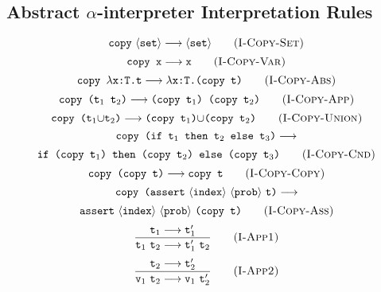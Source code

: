 \documentclass[a4paper]{article}
\begin{document}
\subsection{Abstract $\alpha$-interpreter Interpretation Rules}
\begin{equation}
	\text{\tt copy}\ \langle\text{\tt set}\rangle\longrightarrow\langle\text{\tt set}\rangle
	\tag{\sc I-Copy-Set}
\end{equation}
\begin{equation}
	\text{\tt copy x}\longrightarrow\text{\tt x}
	\tag{\sc I-Copy-Var}
\end{equation}
\begin{equation}
	\text{\tt copy }\lambda\text{\tt x:T.t}\longrightarrow\lambda\text{\tt x:T.(copy t)}
	\tag{\sc I-Copy-Abs}
\end{equation}
\begin{equation}
	\text{\tt copy (t$_1$ t$_2$)}\longrightarrow\text{\tt (copy t$_1$) (copy t$_2$)}
	\tag{\sc I-Copy-App}
\end{equation}
\begin{equation}
	\text{\tt copy (t$_1\cup$t$_2$)}\longrightarrow\text{\tt (copy t$_1$)$\cup$(copy t$_2$)}
	\tag{\sc I-Copy-Union}
\end{equation}
$$
	\text{\tt copy (if t$_1$ then t$_2$ else t$_3$)}\longrightarrow
$$
\begin{equation}
	\text{\tt if (copy t$_1$) then (copy t$_2$) else (copy t$_3$)}
	\tag{\sc I-Copy-Cnd}
\end{equation}
\begin{equation}
	\text{\tt copy (copy t)}\longrightarrow\text{\tt copy t}
	\tag{\sc I-Copy-Copy}
\end{equation}
$$
	\text{\tt copy (assert}\ \langle\text{\tt index}\rangle\ \langle\text{\tt prob}\rangle\ \text{\tt t)}\longrightarrow
$$
\begin{equation}
	\text{\tt assert}\ \langle\text{\tt index}\rangle\ \langle\text{\tt prob}\rangle\ \text{\tt (copy t)}
	\tag{\sc I-Copy-Ass}
\end{equation}
\begin{equation}
	\frac{\text{\tt t}_{1}\longrightarrow\text{\tt t}^{\prime}_{1}}
	{\text{\tt t}_{1}\ \text{\tt t}_{2}\longrightarrow\text{\tt t}^{\prime}_{1}\ \text{\tt t}_{2}}
	\tag{\sc I-App1}
\end{equation}
\begin{equation}
	\frac{\text{\tt t}_{2}\longrightarrow\text{\tt t}^{\prime}_{2}}
	{\text{\tt v}_{1}\ \text{\tt t}_{2}\longrightarrow\text{\tt v}_{1}\ \text{\tt t}^{\prime}_{2}}
	\tag{\sc I-App2}
\end{equation}
\end{document}
